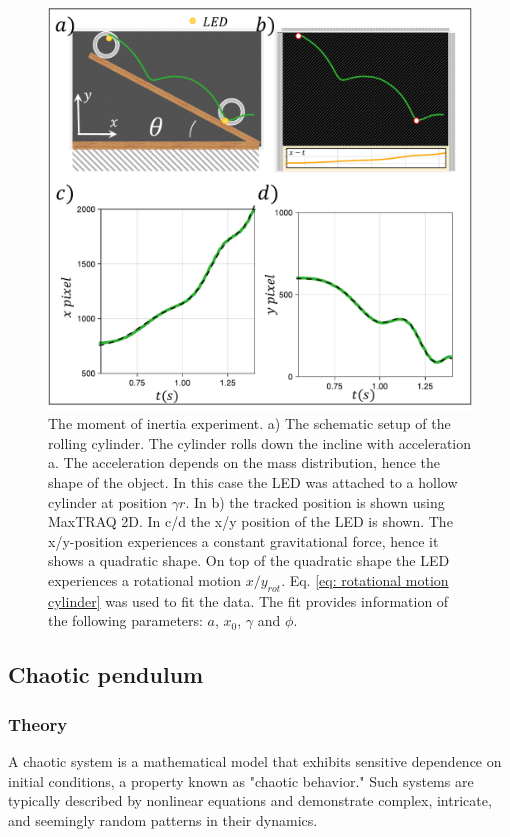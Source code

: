 \documentclass{article}
\begin{document}
\begin{figure}
    \center
    \includegraphics[width = 12 cm]{figures/Rolling Cylinder.pdf}
    \caption{The moment of inertia experiment. a) The schematic setup of the rolling cylinder. The cylinder rolls down the incline with acceleration a. The acceleration depends on the mass distribution, hence the shape of the object. In this case the LED was attached to a hollow cylinder at position $\gamma r$. In b) the tracked position is shown using MaxTRAQ 2D. In c/d the x/y position of the LED is shown. The x/y-position experiences a constant gravitational force, hence it shows a quadratic shape. On top of the quadratic shape the LED experiences a rotational motion $x/y_{rot}$. Eq. \ref{eq: rotational motion cylinder} was used to fit the data. The fit provides information of the following parameters: $a$, $x_0$, $\gamma$ and $\phi$.}
    \label{Fig. rolling cylinder}
\end{figure}
\newpage

\subsection{Chaotic pendulum}
\subsubsection{Theory}
A chaotic system is a mathematical model that exhibits sensitive dependence on initial conditions, a property known as "chaotic behavior." Such systems are typically described by nonlinear equations and demonstrate complex, intricate, and seemingly random patterns in their dynamics. 
\end{document}
